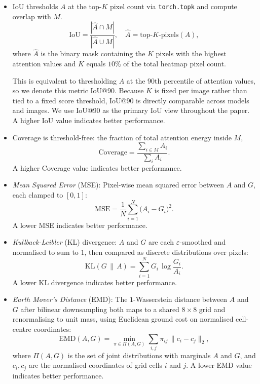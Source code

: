 \documentclass[lineno,pdflatex,sn-mathphys-num]{sn-jnl}%
\theoremstyle{thmstyleone}%
\theoremstyle{thmstyletwo}%
\theoremstyle{thmstylethree}%
\begin{document}
\begin{itemize}
    \item IoU thresholds $A$ at the top-$K$ pixel count via
\texttt{torch.topk} and compute overlap with $M$.
\begin{equation}
\mathrm{IoU} = \frac{|\hat{A} \cap M|}{|\hat{A} \cup M|},
\quad \hat{A} = \text{top-}K\text{-pixels}(A),
\label{eq:iou}
\end{equation}
where $\hat{A}$ is the binary mask containing the $K$ pixels with the
highest attention values and $K$ equals $10\%$ of the total heatmap
pixel count. 

This is equivalent to thresholding $A$ at the
$90$th percentile of attention values, so we denote this metric
IoU@90. Because $K$ is fixed per image rather than tied to a fixed
score threshold, IoU@90 is directly comparable across models and
images. We use IoU@90 as the primary IoU view throughout the paper. A higher IoU value indicates better performance.


\item Coverage is threshold-free: the fraction of total attention energy
inside $M$,
\begin{equation}
  \text{Coverage} = \frac{\sum_{i \in M} A_i}{\sum_i A_i}.
\end{equation}
A higher Coverage value indicates better performance.

\item \textit{Mean Squared Error} (MSE): Pixel-wise mean squared error between $A$ and $G$, each clamped to $[0, 1]$:
\begin{equation}
\mathrm{MSE} = \frac{1}{N}\sum_{i=1}^{N}
\bigl(A_i - G_i\bigr)^{2}.
\label{eq:mse}
\end{equation}
A lower MSE indicates better performance.

\item \textit{Kullback-Leibler} (KL) divergence: $A$ and $G$ are each $\varepsilon$-smoothed and normalised to sum to $1$, then compared as discrete distributions
over pixels:
\begin{equation}
\mathrm{KL}(G \,\|\, A) = \sum_{i=1}^{N} G_i \,
\log\!\frac{G_i}{A_i}.
\label{eq:kl}
\end{equation}
A lower KL divergence indicates better performance.


\item \textit{Earth Mover's Distance} (EMD): The $1$-Wasserstein distance between $A$ and $G$ after bilinear downsampling both maps to a shared $8 \times 8$ grid
and renormalising to unit mass, using Euclidean ground cost on normalised cell-centre coordinates:
\begin{equation}
\mathrm{EMD}(A, G) = \min_{\pi \in \Pi(A, G)}
\sum_{i,j} \pi_{ij} \, \|c_i - c_j\|_2,
\label{eq:emd}
\end{equation}
where $\Pi(A, G)$ is the set of joint distributions with marginals
$A$ and $G$, and $c_i, c_j$ are the normalised coordinates of grid
cells $i$ and $j$. A lower EMD value indicates better performance.


\end{itemize}
\end{document}
